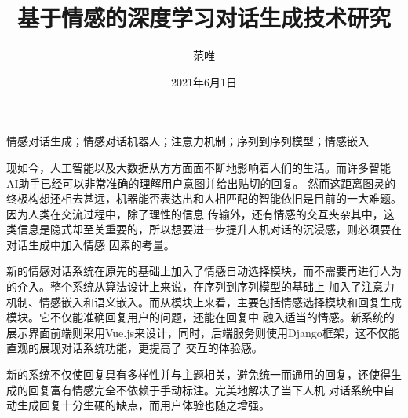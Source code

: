 \documentclass[supercite]{HustGraduPaper}
\title{基于情感的深度学习对话生成技术研究}
\author{范唯}
\date{2021年6月1日}
\theoremstyle{definition}
\begin{document}
\maketitle

\statement

\clearpage


\begin{cnabstract}{情感对话生成；情感对话机器人；注意力机制；序列到序列模型；情感嵌入}

现如今，人工智能以及大数据从方方面面不断地影响着人们的生活。而许多智能AI助手已经可以非常准确的理解用户意图并给出贴切的回复。
然而这距离图灵的终极构想还相去甚远，机器能否表达出和人相匹配的智能依旧是目前的一大难题。因为人类在交流过程中，除了理性的信息
传输外，还有情感的交互夹杂其中，这类信息是隐式却至关重要的，所以想要进一步提升人机对话的沉浸感，则必须要在对话生成中加入情感
因素的考量。

新的情感对话系统在原先的基础上加入了情感自动选择模块，而不需要再进行人为的介入。整个系统从算法设计上来说，在序列到序列模型的基础上
加入了注意力机制、情感嵌入和语义嵌入。而从模块上来看，主要包括情感选择模块和回复生成模块。它不仅能准确回复用户的问题，还能在回复中
融入适当的情感。新系统的展示界面前端则采用Vue.js来设计，同时，后端服务则使用Django框架，这不仅能直观的展现对话系统功能，更提高了
交互的体验感。

新的系统不仅使回复具有多样性并与主题相关，避免统一而通用的回复，还使得生成的回复富有情感完全不依赖于手动标注。完美地解决了当下人机
对话系统中自动生成回复十分生硬的缺点，而用户体验也随之增强。


\end{cnabstract}
\end{document}
